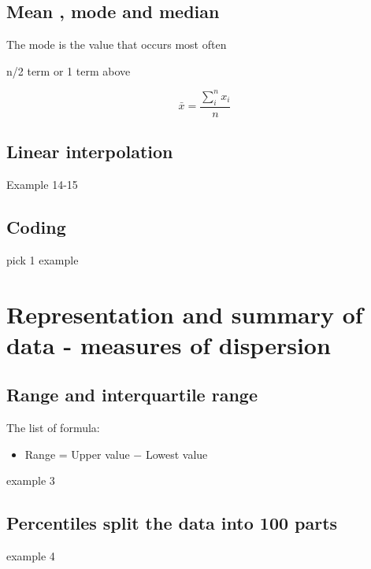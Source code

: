 \documentclass[a4paper]{article}
\begin{document}
\subsection{Mean , mode and median}
\begin{defi}[Mode]
	The mode is the value that occurs most often
\end{defi}

\begin{defi}[Median]
	n/2 term or 1 term above
\end{defi}

\begin{defi}[Mean]
	\[
		\bar{x}=\frac{\sum_i^n x_i}{n}
	\]
\end{defi}

\subsection{Linear interpolation}
\begin{eg}
	Example 14-15
\end{eg}

\subsection{Coding}
\begin{eg}
	pick 1 example
\end{eg}


\section{Representation and summary of data - measures of dispersion}
\subsection{Range and interquartile range}
The list of formula:
\begin{itemize}
	\item Range = Upper value $-$ Lowest value
\end{itemize}
\begin{eg}
	example 3
\end{eg}

\subsection{Percentiles split the data into 100 parts}
\begin{eg}
	example 4
\end{eg}
\end{document}
